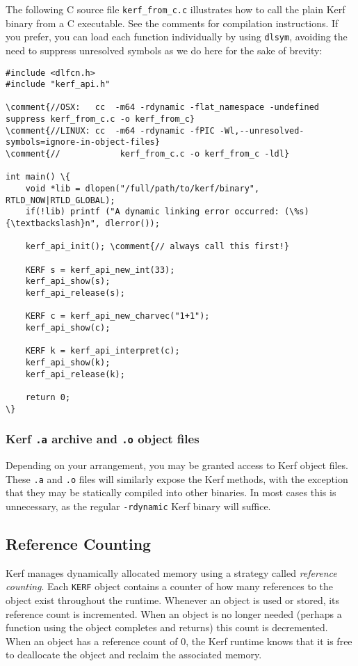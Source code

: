 \documentclass{article}
\newcommand{\comment}[1]{\textcolor{Orange}{#1}}
\begin{document}
\vspace{0.5cm}

The following C source file \texttt{kerf\_from\_c.c} illustrates how to call the plain Kerf binary from a C executable. See the comments for compilation instructions. If you prefer, you can load each function individually by using \texttt{dlsym}, avoiding the need to suppress unresolved symbols as we do here for the sake of brevity:

\begin{Verbatim}
#include <dlfcn.h>
#include "kerf_api.h"

\comment{//OSX:   cc  -m64 -rdynamic -flat_namespace -undefined suppress kerf_from_c.c -o kerf_from_c}
\comment{//LINUX: cc  -m64 -rdynamic -fPIC -Wl,--unresolved-symbols=ignore-in-object-files}
\comment{//            kerf_from_c.c -o kerf_from_c -ldl}

int main() \{
	void *lib = dlopen("/full/path/to/kerf/binary", RTLD_NOW|RTLD_GLOBAL);
	if(!lib) printf ("A dynamic linking error occurred: (\%s){\textbackslash}n", dlerror());

	kerf_api_init(); \comment{// always call this first!}

	KERF s = kerf_api_new_int(33);
	kerf_api_show(s);
	kerf_api_release(s);

	KERF c = kerf_api_new_charvec("1+1");
	kerf_api_show(c);

	KERF k = kerf_api_interpret(c);
	kerf_api_show(k);
	kerf_api_release(k);

	return 0;
\}
\end{Verbatim}

\subsubsection{Kerf \texttt{.a} archive and \texttt{.o} object files}

Depending on your arrangement, you may be granted access to Kerf object files. These \texttt{.a} and \texttt{.o} files will similarly expose the Kerf methods, with the exception that they may be statically compiled into other binaries. In most cases this is unnecessary, as the regular \texttt{-rdynamic} Kerf binary will suffice.

\pagebreak
\subsection{Reference Counting}

Kerf manages dynamically allocated memory using a strategy called \emph{reference counting}. Each \texttt{KERF} object contains a counter of how many references to the object exist throughout the runtime. Whenever an object is used or stored, its reference count is incremented. When an object is no longer needed (perhaps a function using the object completes and returns) this count is decremented. When an object has a reference count of 0, the Kerf runtime knows that it is free to deallocate the object and reclaim the associated memory.
\end{document}

